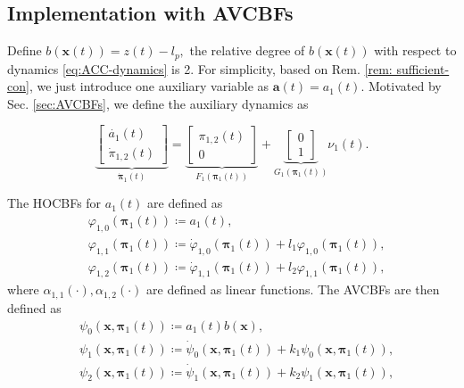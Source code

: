 \subsection{Implementation with AVCBFs}
Define $b(\boldsymbol{x}(t))=z(t)-l_{p},$ the relative degree of $b(\boldsymbol{x}(t))$ with respect to dynamics \eqref{eq:ACC-dynamics} is 2. For simplicity, based on Rem. \ref{rem: sufficient-con}, we just introduce one auxiliary variable as $\boldsymbol{a}(t)=a_{1}(t).$ 
Motivated by Sec. \ref{sec:AVCBFs}, we define the auxiliary dynamics as
\begin{small}
\begin{equation}
\label{eq:Auxiliary-dynamics1}
\underbrace{\begin{bmatrix}
\dot{a_{1}}(t) \\
\dot{\pi}_{1,2}(t) 
\end{bmatrix}}_{\dot{\boldsymbol{\pi}}_{1}(t)}  
=\underbrace{\begin{bmatrix}
 \pi_{1,2}(t) \\
 0
\end{bmatrix}}_{F_{1}(\boldsymbol{{\pi}}_{1}(t))} 
+ \underbrace{\begin{bmatrix}
  0 \\
  1 
\end{bmatrix}}_{G_{1}(\boldsymbol{{\pi}}_{1}(t))}\nu_{1}(t).
\end{equation}
\end{small}
The HOCBFs for $a_{1}(t)$ are defined as 
\begin{equation}
\label{eq:SHOCBF-sequence-ACC}
\begin{split}
&\varphi_{1,0}(\boldsymbol{{\pi}}_{1}(t))\coloneqq a_{1}(t),\\
&\varphi_{1,1}(\boldsymbol{{\pi}}_{1}(t))\coloneqq \dot{\varphi}_{1,0}(\boldsymbol{{\pi}}_{1}(t))+l_{1}\varphi_{1,0}(\boldsymbol{{\pi}}_{1}(t)),\\
&\varphi_{1,2}(\boldsymbol{{\pi}}_{1}(t))\coloneqq \dot{\varphi}_{1,1}(\boldsymbol{{\pi}}_{1}(t))+l_{2}\varphi_{1,1}(\boldsymbol{{\pi}}_{1}(t)),
\end{split}
\end{equation}
where $\alpha_{1,1}(\cdot),\alpha_{1,2}(\cdot)$ are defined as linear functions. The AVCBFs are then defined as
\begin{equation}
\label{eq:AVBCBF-sequence-ACC}
\begin{split}
&\psi_{0}(\boldsymbol{x},\boldsymbol{{\pi}}_{1}(t))\coloneqq a_{1}(t)b(\boldsymbol{x}),\\
&\psi_{1}(\boldsymbol{x},\boldsymbol{{\pi}}_{1}(t))\coloneqq \dot{\psi}_{0}(\boldsymbol{x},\boldsymbol{{\pi}}_{1}(t))+k_{1}\psi_{0}(\boldsymbol{x},\boldsymbol{{\pi}}_{1}(t)),\\
&\psi_{2}(\boldsymbol{x},\boldsymbol{{\pi}}_{1}(t))\coloneqq \dot{\psi}_{1}(\boldsymbol{x},\boldsymbol{{\pi}}_{1}(t))+k_{2}\psi_{1}(\boldsymbol{x},\boldsymbol{{\pi}}_{1}(t)),
\end{split}
\end{equation}
